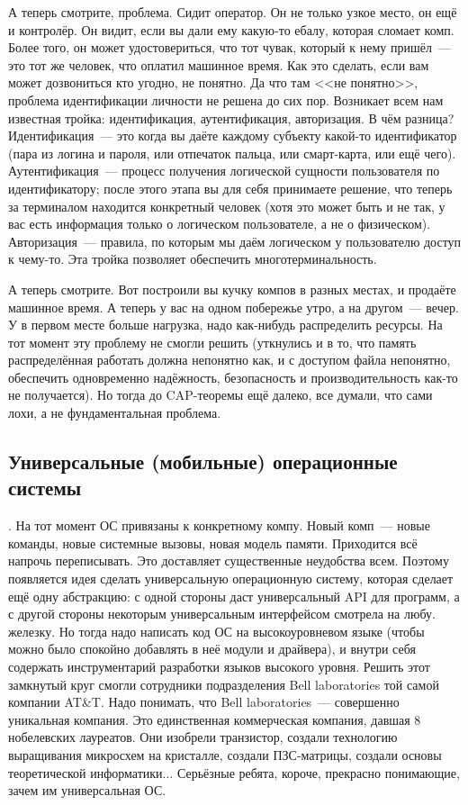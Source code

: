 \documentclass{article}
\begin{document}
    А теперь смотрите, проблема. Сидит оператор. Он не только узкое место, он ещё и контролёр. Он видит, если вы дали ему какую-то ебалу, которая сломает комп. Более того, он может удостовериться, что тот чувак, который к нему пришёл~--- это тот же человек, что оплатил машинное время. Как это сделать, если вам может дозвониться кто угодно, не понятно. Да что там <<не понятно>>, проблема идентификации личности не решена до сих пор. Возникает всем нам известная тройка: идентификация, аутентификация, авторизация. В чём разница? Идентификация~--- это когда вы даёте каждому субъекту какой-то идентификатор (пара из логина и пароля, или отпечаток пальца, или смарт-карта, или ещё чего). Аутентификация~--- процесс получения логической сущности пользователя по идентификатору; после этого этапа вы для себя принимаете решение, что теперь за терминалом находится конкретный человек (хотя это может быть и не так, у вас есть информация только о логическом пользователе, а не о физическом). Авторизация~--- правила, по которым мы даём логическом у пользователю доступ к чему-то. Эта тройка позволяет обеспечить многотерминальность.
    
    А теперь смотрите. Вот построили вы кучку компов в разных местах, и продаёте машинное время. А теперь у вас на одном побережье утро, а на другом~--- вечер. У в первом месте больше нагрузка, надо как-нибудь распределить ресурсы. На тот момент эту проблему не смогли решить (уткнулись и в то, что память распределённая работать должна непонятно как, и с доступом файла непонятно, обеспечить одновременно надёжность, безопасность и производительность как-то не получается). Но тогда до CAP-теоремы ещё далеко, все думали, что сами лохи, а не фундаментальная проблема.
    
    \subsection{Универсальные (мобильные) операционные системы}.
    На тот момент ОС привязаны к конкретному компу. Новый комп~--- новые команды, новые системные вызовы, новая модель памяти. Приходится всё напрочь переписывать. Это доставляет существенные неудобства всем. Поэтому появляется идея сделать универсальную операционную систему, которая сделает ещё одну абстракцию: с одной стороны даст универсальный API для программ, а с другой стороны некоторым универсальным интерфейсом смотрела на любу. железку. Но тогда надо написать код ОС на высокоуровневом языке (чтобы можно было спокойно добавлять в неё модули и драйвера), и внутри себя содержать инструментарий разработки языков высокого уровня. Решить этот замкнутый круг смогли сотрудники подразделения Bell laboratories той самой компании AT\&T. Надо понимать, что Bell laboratories~--- совершенно уникальная компания. Это единственная коммерческая компания, давшая 8 нобелевских лауреатов. Они изобрели транзистор, создали технологию выращивания микросхем на кристалле, создали ПЗС-матрицы, создали основы теоретической информатики... Серьёзные ребята, короче, прекрасно понимающие, зачем им универсальная ОС.
    
\end{document}

